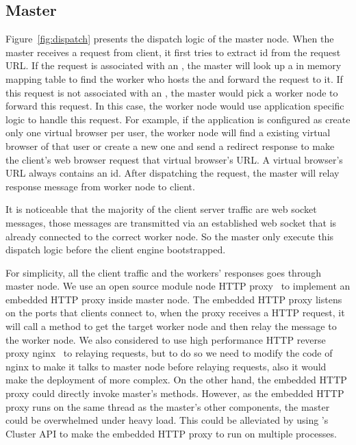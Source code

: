 \newarchitectureoverview{}




\subsection{Master}
Figure~\ref{fig:dispatch} presents the dispatch logic of the master node.
When the master receives a request from client,
it first tries to extract \appins{} id from the request URL.
If the request is associated with an \appins{},
the master will look up a in memory mapping table to find the worker
who hosts the \appins{} and forward the request to it.
If this request is not associated with an \appins{},
the master would pick a worker node to forward this request.
In this case, the worker node would use application specific logic to handle this request.
For example, if the application is configured as create only one virtual browser per user,
the worker node will find a existing virtual browser of that user or create a new one
and send a redirect response to make the client's web browser request that virtual browser's URL.
A virtual browser's URL always contains an \appins{} id.
After dispatching the request,
the master will relay response message from worker node to client.

It is noticeable that the majority of the client server traffic are web socket messages,
those messages are transmitted via an established web socket that is already connected to the 
correct worker node.
So the master only execute this dispatch logic before the client engine bootstrapped.

For simplicity, all the client traffic and the workers' responses goes through master node.
We use an open source \nodejs{} module node HTTP proxy~\cite{nodeproxy} to implement
an embedded HTTP proxy inside master node.
The embedded HTTP proxy listens on the ports that clients connect to,
when the proxy receives a HTTP request,
it will call a method to get the target worker node and then relay the message
to the worker node.
We also considered to use high performance HTTP reverse proxy nginx~\cite{nginx}
to relaying requests,
but to do so we need to modify the code of nginx to 
make it talks to master node before relaying requests,
also it would make the deployment of \cb{} more complex.
On the other hand, the embedded HTTP proxy could directly invoke master's methods.
However, as the embedded HTTP proxy runs on the same thread as the master's other
components, the master could be overwhelmed under heavy load.
This could be alleviated by using \nodejs{}'s Cluster API to make the embedded HTTP
proxy to run on multiple processes.

